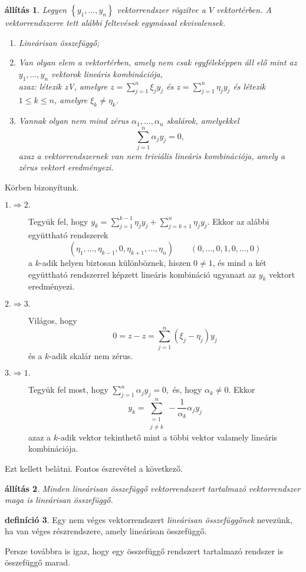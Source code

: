 \documentclass[9pt, a4paper, showtrims]{memoir}
\makeatletter
\renewenvironment{proof}[1][\proofname]
    {\par\pushQED{\qed}%
    \normalfont \topsep6\p@\@plus6\p@\relax
    \trivlist
    \item[\hskip\labelsep
        \itshape
    #1\@addpunct{:}]\ignorespaces}
    {\popQED\endtrivlist\@endpefalse}
\theoremstyle{plain}
\newtheorem{proposition}{állítás}[chapter]
\theoremstyle{remark}
\theoremstyle{definition}
\newtheorem{definition}[proposition]{definíció}
\makeatother
\begin{document}
\begin{proposition}
	Legyen $\left\{ y_1,\ldots,y_n \right\}$ vektorrendszer rögzítve a $V$ vektortérben.
	A vektorrendszerre tett alábbi feltevések egymással ekvivalensek.
	\begin{enumerate}
		\item Lineárisan összefüggő;
		\item Van olyan elem a vektortérben, amely nem csak egyféleképpen áll elő mint az $y_1,\ldots,y_n$
		      vektorok lineáris kombinációja,\\
		      azaz:
		      létezik z\in V, amelyre $z=\sum_{j=1}^n\xi_jy_j$ és $z=\sum_{j=1}^n\eta_jy_j$
		      és létezik $1\leq k\leq n$, amelyre $\xi_k\neq\eta_k$.
		\item Vannak olyan nem mind zérus $\alpha_1,\ldots,\alpha_n$ skalárok, amelyekkel
		      \[
			      \sum_{j=1}^n\alpha_jy_j=0,
		      \]
              azaz a vektorrendszernek van nem triviális lineáris kombinációja, amely a zérus vektort eredményezi.
              \qedhere
	\end{enumerate}
\end{proposition}
\begin{proof}
	Körben bizonyítunk.
	\begin{description}
		\item[$1.\Rightarrow 2.$]
		      Tegyük fel, hogy $y_k=\sum_{j=1}^{k-1}\eta_jy_j+\sum_{j=k+1}^n\eta_jy_j$.
		      Ekkor az alábbi együttható rendszerek
		      \[
			      \left( \eta_1,\ldots,\eta_{k-1},0,\eta_{k+1},\ldots,\eta_n \right)
			      \qquad
			      \left( 0,\ldots,0,1,0,\ldots,0 \right)
		      \]
		      a $k$-adik helyen biztosan különböznek,
		      hiszen $0\neq 1$,
		      és mind a két együttható rendszerrel képzett lineáris kombináció ugyanazt az $y_k$ vektort eredményezi.
		\item[$2.\Rightarrow 3.$]
		      Világos, hogy
		      \[
			      0=z-z=
			      \sum_{j=1}^n\left( \xi_j-\eta_j \right)y_j
		      \]
		      és a $k$-adik skalár nem zérus.
		\item[$3.\Rightarrow 1.$]
		      Tegyük fel most, hogy
		      \(
		      \sum_{j=1}^n\alpha_jy_j=0,
		      \)
		      és, hogy $\alpha_k\neq 0.$
		      Ekkor
		      \[
			      y_k=\sum_{\substack{=1\\j\neq k}}^n-\frac{1}{\alpha_k}\alpha_jy_j
		      \]
		      azaz a $k$-adik vektor tekinthető mint a többi vektor valamely lineáris kombinációja.
	\end{description}
	Ezt kellett belátni.
\end{proof}
Fontos észrevétel a következő.
\begin{proposition}
	Minden lineárisan összefüggő vektorrendszert tartalmazó vektorrendszer maga is lineárisan összefüggő.
\end{proposition}
\begin{definition}
    Egy nem véges vektorrendszert \emph{lineárisan összefüggőnek} nevezünk,
	ha van véges részrendszere, amely lineárisan összefüggő.
\end{definition}
Persze továbbra is igaz, hogy egy összefüggő rendszert tartalmazó rendszer is összefüggő marad.
\end{document}
